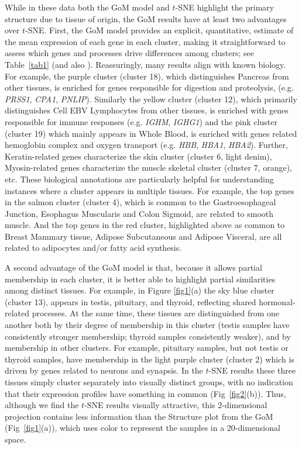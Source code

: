 \documentclass[10pt,letterpaper]{article}
\begin{document}
While in these data both the GoM model and $t$-SNE highlight the primary structure due to tissue of origin, the GoM results have at least two advantages over $t$-SNE.
First, the GoM model provides an explicit, quantitative, estimate of the mean expression of each gene in each cluster, making it straightforward to assess which genes and processes drive differences among clusters; see Table~\ref{tab1} (and also ). Reassuringly, many results align with known biology. For example,  the purple cluster (cluster 18), which distinguishes Pancreas from other tissues, is enriched for genes responsible for digestion and proteolysis, (e.g. \textit{PRSS1}, \textit{CPA1}, \textit{PNLIP}). Similarly the yellow cluster (cluster 12), which primarily distinguishes Cell EBV Lymphocytes from other tissues, is enriched with genes responsible for immune responses (e.g. \textit{IGHM}, \textit{IGHG1}) and the pink cluster (cluster 19) which mainly appears in Whole Blood, is enriched with genes related hemoglobin complex and oxygen transport (e.g. \textit{HBB}, \textit{HBA1}, \textit{HBA2}). Further, Keratin-related genes characterize the skin cluster (cluster 6, light denim), Myosin-related genes characterize the muscle skeletal cluster (cluster 7, orange), etc. These biological annotations are particularly helpful for understanding instances where a cluster appears in multiple tissues. For example,
the top genes in the salmon cluster (cluster 4), which is common to the Gastroesophageal Junction, Esophagus Muscularis and Colon Sigmoid, are related to smooth muscle.
And the top genes in the red cluster, highlighted above as common to Breast Mammary tissue, Adipose Subcutaneous and Adipose Visceral, are all related to adipocytes and/or fatty acid synthesis.

A second advantage of the GoM model is that, because it allows partial membership in each cluster, it is better able to highlight partial similarities among distinct tissues.
For example, in Figure \ref{fig1}(a) the
 sky blue cluster (cluster 13), appears in testis, pituitary, and thyroid, reflecting shared hormonal-related processes. At the same time, these tissues
are distinguished from one another both by their degree of membership in this cluster (testis samples have consistently stronger membership; thyroid samples consistently weaker), and by membership in other clusters. For example, pituitary samples, but not testis or thyroid samples, have membership in the light purple cluster (cluster 2)
which is driven by genes related to neurons and synapsis. In the $t$-SNE results these three tissues simply cluster separately into visually distinct groups, with no indication that their expression profiles have something in common (Fig~\ref{fig2}(b)). Thus, although we find the $t$-SNE results visually attractive, this 2-dimensional projection contains less information than the Structure plot from the GoM (Fig~\ref{fig1}(a)), which uses color to represent the samples in a 20-dimensional space.
\end{document}
